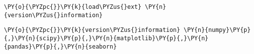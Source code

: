 
{\par%
\vspace{-1\baselineskip}%
}%
\begin{notebookcell}[2]%
\begin{addmargin}[\cellleftmargin]{0em}%
{\smaller%
\par%
%
\vspace{-1\smallerfontscale}%
\begin{Verbatim}[commandchars=\\\{\}]
\PY{o}{\PYZpc{}}\PY{k}{load\PYZus{}ext} \PY{n}{version\PYZus{}information}
\end{Verbatim}
%
\par%
\vspace{-1\smallerfontscale}}%
\end{addmargin}
\end{notebookcell}



{\par%
\vspace{-1\baselineskip}%
}%
\begin{notebookcell}[6]%
\begin{addmargin}[\cellleftmargin]{0em}%
{\smaller%
\par%
%
\vspace{-1\smallerfontscale}%
\begin{Verbatim}[commandchars=\\\{\}]
\PY{o}{\PYZpc{}}\PY{k}{version\PYZus{}information} \PY{n}{numpy}\PY{p}{,}\PY{n}{scipy}\PY{p}{,}\PY{n}{matplotlib}\PY{p}{,}\PY{n}{pandas}\PY{p}{,}\PY{n}{seaborn}
\end{Verbatim}
%
\par%
\vspace{-1\smallerfontscale}}%
\end{addmargin}
\end{notebookcell}

\par\vspace{1\smallerfontscale}%
    
